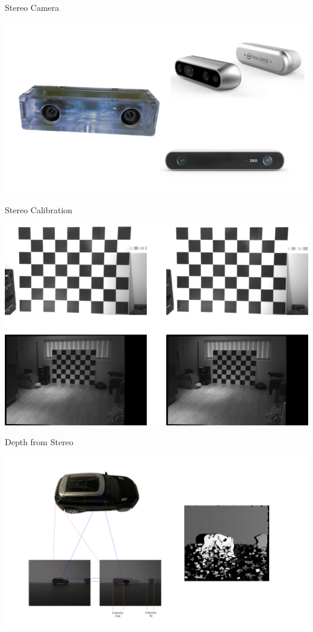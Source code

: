 \documentclass[aspectratio=169]{beamer}
\begin{document}
\begin{frame}{Stereo Camera}
  \begin{center}
    \includegraphics[height=0.9\textheight]{./img/cameras.png}
  \end{center}
\end{frame}

\note{
}


\begin{frame}{Stereo Calibration}
  \begin{center}
    \includegraphics[height=0.9\textheight]{./img/stereo_calib.png}
  \end{center}
\end{frame}

\note{
}

\begin{frame}{Depth from Stereo}
  \begin{center}
    \includegraphics[height=0.9\textheight]{./img/disparity.png}
  \end{center}
\end{frame}
\end{document}
